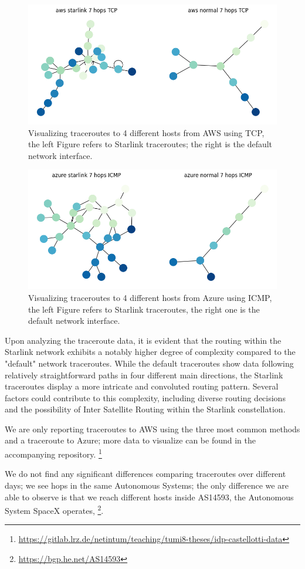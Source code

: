 \documentclass[IN,11pt,twoside,openright,idp,english]{tumthesis}
\begin{document}
\begin{figure}
    \label{fig:tr_aws_tcp}
    \centering
    \includegraphics[width=0.6\columnwidth]{img/tr_aws_tcp.png}
    \caption{Visualizing traceroutes to 4 different hosts from AWS using TCP, the left Figure refers to Starlink traceroutes; the right is the default network interface.}
\end{figure}
    
\begin{figure}
    \label{fig:tr_azure_icmp}
    \centering
    \includegraphics[width=0.6\columnwidth]{img/tr_azure_icmp.png}
    \caption{Visualizing traceroutes to 4 different hosts from Azure using ICMP, the left Figure refers to Starlink traceroutes, the right one is the default network interface.}
\end{figure}
    
Upon analyzing the traceroute data, it is evident that the routing within the Starlink network exhibits a notably higher degree of complexity compared to the "default" network traceroutes. While the default traceroutes show data following relatively straightforward paths in four different main directions, the Starlink traceroutes display a more intricate and convoluted routing pattern. Several factors could contribute to this complexity, including diverse routing decisions and the possibility of Inter Satellite Routing within the Starlink constellation.

We are only reporting traceroutes to AWS using the three most common methods and a traceroute to Azure; more data to visualize can be found in the accompanying repository. \footnote{\url{https://gitlab.lrz.de/netintum/teaching/tumi8-theses/idp-castellotti-data}}
    
We do not find any significant differences comparing traceroutes over different days; we see hops in the same Autonomous Systems; the only difference we are able to observe is that we reach different hosts inside AS14593, the Autonomous System SpaceX operates, \footnote{\url{https://bgp.he.net/AS14593}}.
    
\end{document}
